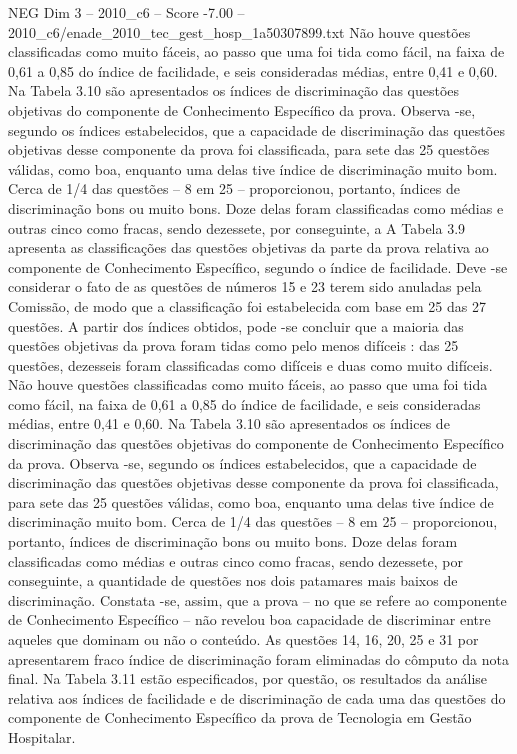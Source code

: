 \begin{textsample}{NEG Dim 3 – 2010\_c6 – Score -7.00 – 2010\_c6/enade\_2010\_tec\_gest\_hosp\_1a50307899.txt}
Não houve questões classificadas como muito fáceis, ao passo que uma foi tida como fácil, na faixa de 0,61 a 0,85 do índice de facilidade, e seis consideradas médias, entre 0,41 e 0,60.
Na Tabela 3.10 são apresentados os índices de discriminação das questões objetivas do componente de Conhecimento Específico da prova.
Observa -se, segundo os índices estabelecidos, que a capacidade de discriminação das questões objetivas desse componente da prova foi classificada, para sete das 25 questões válidas, como boa, enquanto uma delas tive índice de discriminação muito bom.
Cerca de 1/4 das questões – 8 em 25 – proporcionou, portanto, índices de discriminação bons ou muito bons.
Doze delas foram classificadas como médias e outras cinco como fracas, sendo dezessete, por conseguinte, a A Tabela 3.9 apresenta as classificações das questões objetivas da parte da prova relativa ao componente de Conhecimento Específico, segundo o índice de facilidade.
Deve -se considerar o fato de as questões de números 15 e 23 terem sido anuladas pela Comissão, de modo que a classificação foi estabelecida com base em 25 das 27 questões.
A partir dos índices obtidos, pode -se concluir que a maioria das questões objetivas da prova foram tidas como pelo menos difíceis : das 25 questões, dezesseis foram classificadas como difíceis e duas como muito difíceis.
Não houve questões classificadas como muito fáceis, ao passo que uma foi tida como fácil, na faixa de 0,61 a 0,85 do índice de facilidade, e seis consideradas médias, entre 0,41 e 0,60.
Na Tabela 3.10 são apresentados os índices de discriminação das questões objetivas do componente de Conhecimento Específico da prova.
Observa -se, segundo os índices estabelecidos, que a capacidade de discriminação das questões objetivas desse componente da prova foi classificada, para sete das 25 questões válidas, como boa, enquanto uma delas tive índice de discriminação muito bom.
Cerca de 1/4 das questões – 8 em 25 – proporcionou, portanto, índices de discriminação bons ou muito bons.
Doze delas foram classificadas como médias e outras cinco como fracas, sendo dezessete, por conseguinte, a quantidade de questões nos dois patamares mais baixos de discriminação.
Constata -se, assim, que a prova – no que se refere ao componente de Conhecimento Específico – não revelou boa capacidade de discriminar entre aqueles que dominam ou não o conteúdo.
As questões 14, 16, 20, 25 e 31 por apresentarem fraco índice de discriminação foram eliminadas do cômputo da nota final.
Na Tabela 3.11 estão especificados, por questão, os resultados da análise relativa aos índices de facilidade e de discriminação de cada uma das questões do componente de Conhecimento Específico da prova de Tecnologia em Gestão Hospitalar.

\end{textsample}

